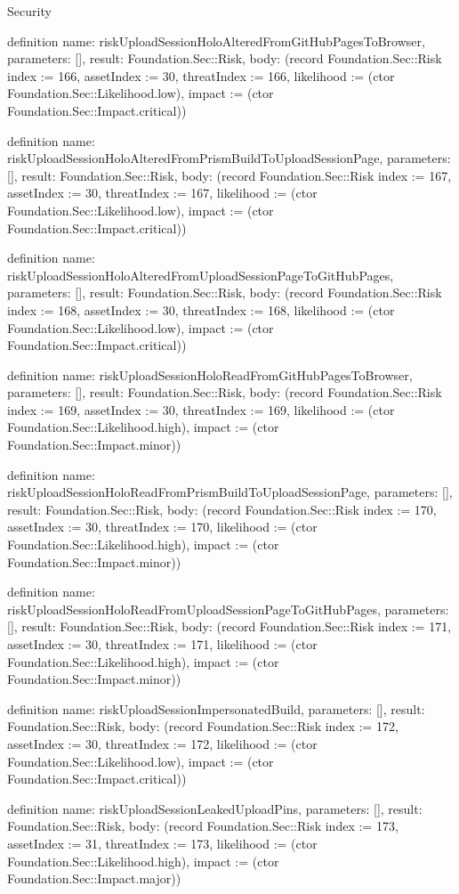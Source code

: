 \begin{lexlean}{Security}
\begin{semanticmodule}
definition{
  name: riskUploadSessionHoloAlteredFromGitHubPagesToBrowser,
  parameters: [],
  result: Foundation.Sec::Risk,
  body: (record Foundation.Sec::Risk {index := 166, assetIndex := 30, threatIndex := 166, likelihood := (ctor Foundation.Sec::Likelihood.low), impact := (ctor Foundation.Sec::Impact.critical)})
}

definition{
  name: riskUploadSessionHoloAlteredFromPrismBuildToUploadSessionPage,
  parameters: [],
  result: Foundation.Sec::Risk,
  body: (record Foundation.Sec::Risk {index := 167, assetIndex := 30, threatIndex := 167, likelihood := (ctor Foundation.Sec::Likelihood.low), impact := (ctor Foundation.Sec::Impact.critical)})
}

definition{
  name: riskUploadSessionHoloAlteredFromUploadSessionPageToGitHubPages,
  parameters: [],
  result: Foundation.Sec::Risk,
  body: (record Foundation.Sec::Risk {index := 168, assetIndex := 30, threatIndex := 168, likelihood := (ctor Foundation.Sec::Likelihood.low), impact := (ctor Foundation.Sec::Impact.critical)})
}

definition{
  name: riskUploadSessionHoloReadFromGitHubPagesToBrowser,
  parameters: [],
  result: Foundation.Sec::Risk,
  body: (record Foundation.Sec::Risk {index := 169, assetIndex := 30, threatIndex := 169, likelihood := (ctor Foundation.Sec::Likelihood.high), impact := (ctor Foundation.Sec::Impact.minor)})
}

definition{
  name: riskUploadSessionHoloReadFromPrismBuildToUploadSessionPage,
  parameters: [],
  result: Foundation.Sec::Risk,
  body: (record Foundation.Sec::Risk {index := 170, assetIndex := 30, threatIndex := 170, likelihood := (ctor Foundation.Sec::Likelihood.high), impact := (ctor Foundation.Sec::Impact.minor)})
}

definition{
  name: riskUploadSessionHoloReadFromUploadSessionPageToGitHubPages,
  parameters: [],
  result: Foundation.Sec::Risk,
  body: (record Foundation.Sec::Risk {index := 171, assetIndex := 30, threatIndex := 171, likelihood := (ctor Foundation.Sec::Likelihood.high), impact := (ctor Foundation.Sec::Impact.minor)})
}

definition{
  name: riskUploadSessionImpersonatedBuild,
  parameters: [],
  result: Foundation.Sec::Risk,
  body: (record Foundation.Sec::Risk {index := 172, assetIndex := 30, threatIndex := 172, likelihood := (ctor Foundation.Sec::Likelihood.low), impact := (ctor Foundation.Sec::Impact.critical)})
}

definition{
  name: riskUploadSessionLeakedUploadPins,
  parameters: [],
  result: Foundation.Sec::Risk,
  body: (record Foundation.Sec::Risk {index := 173, assetIndex := 31, threatIndex := 173, likelihood := (ctor Foundation.Sec::Likelihood.high), impact := (ctor Foundation.Sec::Impact.major)})
}


\end{semanticmodule}
\end{lexlean}
